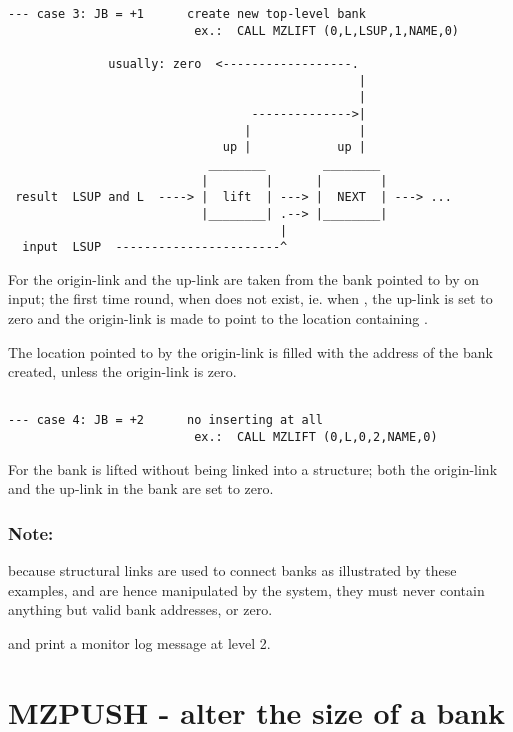\begin{verbatim}
--- case 3: JB = +1      create new top-level bank
                          ex.:  CALL MZLIFT (0,L,LSUP,1,NAME,0)

              usually: zero  <------------------.
                                                 |
                                                 |
                                  -------------->|
                                 |               |
                              up |            up |
                            ________        ________
                           |        |      |        |
 result  LSUP and L  ----> |  lift  | ---> |  NEXT  | ---> ...
                           |________| .--> |________|
                                      |
  input  LSUP  -----------------------^
\end{verbatim} 
For    the origin-link and the up-link are taken from
the bank  pointed to by  on input;
the first time round, when  does not exist,
ie. when ,
the up-link is set to zero and the origin-link is made to point
to the location containing .

The location pointed to by the origin-link is filled with the address
of the bank created, unless the origin-link is zero.
\begin{verbatim}

--- case 4: JB = +2      no inserting at all
                          ex.:  CALL MZLIFT (0,L,0,2,NAME,0)
\end{verbatim} 
For    the bank is lifted without being linked into a structure;
both the origin-link and the up-link in the bank are set to zero. 

\subsubsection*{Note:} 

because structural links are used to connect banks as
illustrated by these examples, and are hence manipulated by the system,
they must never contain anything but valid bank addresses, or zero.

 and  print a monitor log message at level 2.

\section{MZPUSH - alter the size of a bank}

